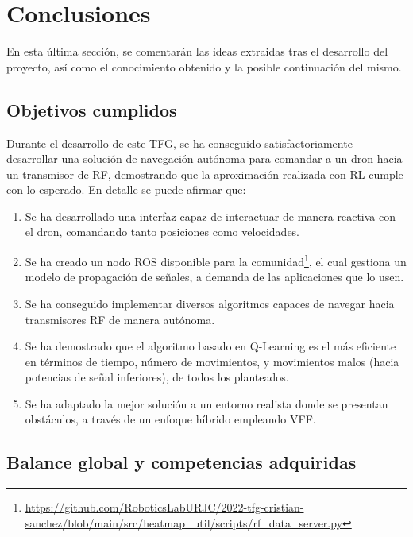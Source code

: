 \chapter{Conclusiones}
\label{cap:capitulo5}

En esta última sección, se comentarán las ideas extraidas tras el desarrollo del proyecto, así como el conocimiento obtenido y la posible continuación del mismo.

\section{Objetivos cumplidos}
\label{sec:objetivos_cumplidos}

Durante el desarrollo de este \ac{TFG}, se ha conseguido satisfactoriamente desarrollar una solución de navegación autónoma para comandar a un dron hacia un transmisor de \ac{RF}, demostrando que la aproximación realizada con \ac{RL} cumple con lo esperado. En detalle se puede afirmar que:

\begin{enumerate}
    \item Se ha desarrollado una interfaz capaz de interactuar de manera reactiva con el dron, comandando tanto posiciones como velocidades.
    \item Se ha creado un nodo \ac{ROS} disponible para la comunidad\footnote[1]{\url{https://github.com/RoboticsLabURJC/2022-tfg-cristian-sanchez/blob/main/src/heatmap_util/scripts/rf_data_server.py}}, el cual gestiona un modelo de propagación de señales, a demanda de las aplicaciones que lo usen.
    \item Se ha conseguido implementar diversos algoritmos capaces de navegar hacia transmisores \ac{RF} de manera autónoma.
    \item Se ha demostrado que el algoritmo basado en Q-Learning es el más eficiente en términos de tiempo, número de movimientos, y movimientos malos (hacia potencias de señal inferiores), de todos los planteados.
    \item Se ha adaptado la mejor solución a un entorno realista donde se presentan obstáculos, a través de un enfoque híbrido empleando \ac{VFF}.
\end{enumerate}

\section{Balance global y competencias adquiridas}
\label{sec:balance_global_competencias_adquiridas}


